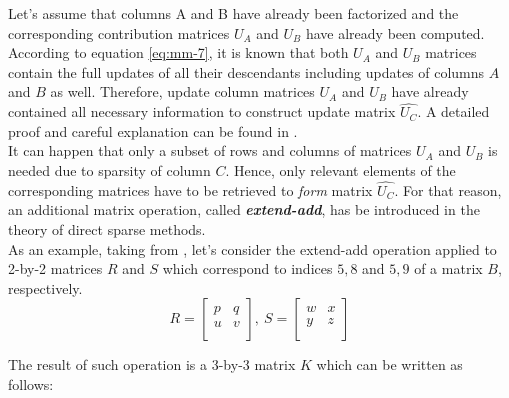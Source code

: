 Let's assume that columns A and B have already been factorized and the corresponding contribution matrices $U_{A}$ and $U_{B}$ have already been computed. According to equation \ref{eq:mm-7}, it is known that both $U_{A}$ and $U_{B}$ matrices contain the full updates of all their descendants including updates of columns $A$ and $B$ as well. Therefore, update column matrices $U_{A}$ and $U_{B}$ have already contained all necessary information to construct update matrix $\hat{U_{C}}$. A detailed proof and careful explanation can be found in \cite{mult-frontal-original:2}.\\


It can happen that only a subset of rows and columns of matrices $U_{A}$ and $U_{B}$ is needed due to sparsity of column $C$. Hence, only relevant elements of the corresponding matrices have to be retrieved to \textit{form} matrix $\hat{U_{C}}$. For that reason, an additional matrix operation, called \textbf{\textit{extend-add}}, has be introduced in the theory of direct sparse methods.\\



As an example, taking from \cite{mult-frontal-original:2}, let's consider the extend-add operation applied to 2-by-2 matrices $R$ and $S$ which correspond to indices ${5,8}$ and ${5,9}$ of a matrix $B$, respectively.\\

\begin{equation}
R = \begin{bmatrix}
p & q \\
u & v \\
\end{bmatrix} 
,
\:
S = \begin{bmatrix}
w & x \\
y & z \\
\end{bmatrix} 
\end{equation}

The result of such operation is a 3-by-3 matrix $K$ which can be written as follows:\\

